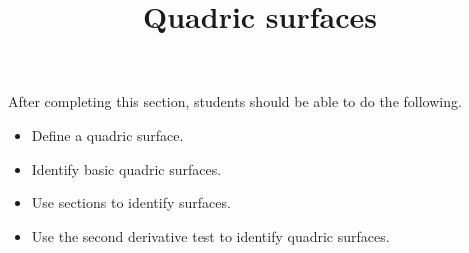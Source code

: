 \documentclass{ximera}
\title{Quadric surfaces}
\begin{document}
\begin{abstract}
\end{abstract}

\maketitle

\begin{sectionOutcomes}

After completing this section, students should be able to do the following.

\begin{itemize}
\item Define a quadric surface.
\item Identify basic quadric surfaces.
\item Use sections to identify surfaces.
\item Use the second derivative test to identify quadric surfaces.
\end{itemize}

\end{sectionOutcomes}
\end{document}
